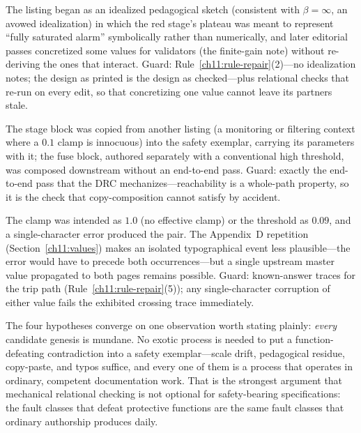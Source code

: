 \begin{hypothesis}\label{ch11:hyp-ideal}
The listing began as an idealized pedagogical sketch (consistent with $\beta=\infty$, an avowed idealization) in which the red stage's plateau was meant to represent ``fully saturated alarm'' symbolically rather than numerically, and later editorial passes concretized some values for validators (the finite-gain note) without re-deriving the ones that interact. Guard: Rule~\ref{ch11:rule-repair}(2)---no idealization notes; the design as printed is the design as checked---plus relational checks that re-run on every edit, so that concretizing one value cannot leave its partners stale.
\end{hypothesis}

\begin{hypothesis}\label{ch11:hyp-template}
The stage block was copied from another listing (a monitoring or filtering context where a $0.1$ clamp is innocuous) into the safety exemplar, carrying its parameters with it; the fuse block, authored separately with a conventional high threshold, was composed downstream without an end-to-end pass. Guard: exactly the end-to-end pass that the DRC mechanizes---reachability is a whole-path property, so it is the check that copy-composition cannot satisfy by accident.
\end{hypothesis}

\begin{hypothesis}\label{ch11:hyp-typo}
The clamp was intended as $1.0$ (no effective clamp) or the threshold as $0.09$, and a single-character error produced the pair. The Appendix~D repetition (Section~\ref{ch11:values}) makes an isolated typographical event less plausible---the error would have to precede both occurrences---but a single upstream master value propagated to both pages remains possible. Guard: known-answer traces for the trip path (Rule~\ref{ch11:rule-repair}(5)); any single-character corruption of either value fails the exhibited crossing trace immediately.
\end{hypothesis}

The four hypotheses converge on one observation worth stating plainly: \emph{every} candidate genesis is mundane. No exotic process is needed to put a function-defeating contradiction into a safety exemplar---scale drift, pedagogical residue, copy-paste, and typos suffice, and every one of them is a process that operates in ordinary, competent documentation work. That is the strongest argument that mechanical relational checking is not optional for safety-bearing specifications: the fault classes that defeat protective functions are the same fault classes that ordinary authorship produces daily.

